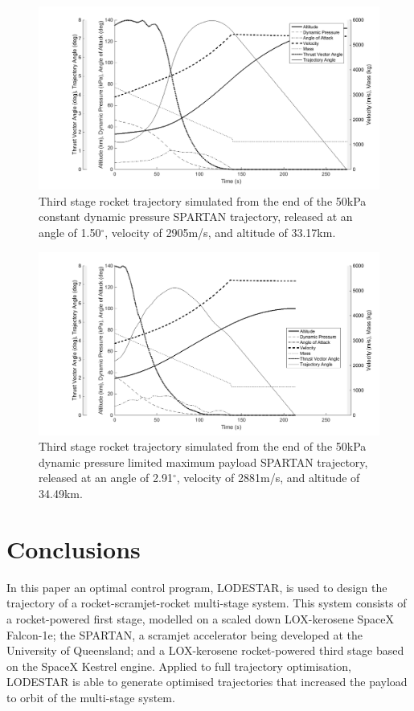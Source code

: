 \documentclass[journal]{new-aiaa}
\newcommand{\SeparationAltConstq}{33.17}
\newcommand{\SeparationAltFiftykPa}{34.49}
\newcommand{\SeparationvConstq}{2905}
\newcommand{\SeparationvFiftykPa}{2881}
\newcommand{\SeparationAngleConstq}{1.50}
\newcommand{\SeparationAngleFiftykPa}{2.91}
\begin{document}
\begin{figure}[H]
	\centering
	\includegraphics[width=0.8\linewidth]{ThirdStageConstQ}
	\caption{Third stage rocket trajectory simulated from the end of the 50kPa constant dynamic pressure SPARTAN trajectory, released at an angle of \SeparationAngleConstq $^\circ$, velocity of \SeparationvConstq m/s, and altitude of \SeparationAltConstq km.}
	\label{fig:ThirdStageConstQ}
\end{figure}
\begin{figure}[H]
	
	\centering
	\includegraphics[width=0.8\linewidth]{ThirdStage50kpaConstrained}
	\caption{Third stage rocket trajectory simulated from the end of the 50kPa dynamic pressure limited maximum payload SPARTAN trajectory, released at an angle of \SeparationAngleFiftykPa $^\circ$, velocity of \SeparationvFiftykPa m/s, and altitude of \SeparationAltFiftykPa km.}
	\label{fig:ThirdStage50kPa}
\end{figure}

\section{Conclusions}


In this paper an optimal control program, LODESTAR, is used to design the trajectory of a rocket-scramjet-rocket multi-stage system. This system consists of a rocket-powered first stage, modelled on a scaled down LOX-kerosene SpaceX Falcon-1e; the SPARTAN, a scramjet accelerator being developed at the University of Queensland; and a LOX-kerosene rocket-powered third stage based on the SpaceX Kestrel engine. Applied to full trajectory optimisation, LODESTAR is able to generate optimised trajectories that increased the payload to orbit of the multi-stage system.
\end{document}
